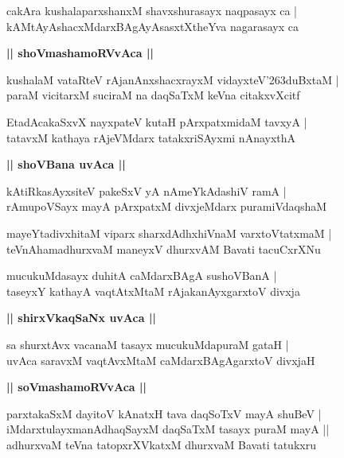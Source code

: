 \documentclass[twoside,12pt,openright]{book}
\def\S{\char'263}
\newcounter{shloka}[chapter]
\def\uvaca#1{\centerline{{\large\textbf{#1}}}}
\begin{document}
\begin{shloka}%
cakAra kushalaparxshanxM shavxshurasayx naqpasayx ca |\\
kAMtAyAshacxMdarxBAgAyAsasxtXtheYva nagarasayx ca 
\end{shloka}

\uvaca{|| shoVmashamoRVvAca ||}

\begin{shloka}%
kushalaM vataRteV rAjanAnxshacxrayxM vidayxteV\S duBxtaM |\\
paraM vicitarxM suciraM na daqSaTxM keVna citakxvXcitf 
\end{shloka}

\begin{shloka}%
EtadAcakaSxvX nayxpateV kutaH pArxpatxmidaM tavxyA |\\
tatavxM kathaya rAjeVMdarx tatakxriSAyxmi nAnayxthA 
\end{shloka}

\uvaca{|| shoVBana uvAca ||}

\begin{shloka}%
kAtiRkasAyxsiteV  pakeSxV yA nAmeYkAdashiV ramA |\\
rAmupoVSayx mayA pArxpatxM divxjeMdarx puramiVdaqshaM 
\end{shloka}

\begin{shloka}%
mayeYtadivxhitaM viparx sharxdAdhxhiVnaM varxtoVtatxmaM |\\
teVnAhamadhurxvaM maneyxV dhurxvAM Bavati tacuCxrXNu
\end{shloka}

\begin{shloka}%
mucukuMdasayx duhitA caMdarxBAgA sushoVBanA |\\
taseyxY kathayA vaqtAtxMtaM rAjakanAyxgarxtoV divxja
\end{shloka}

\uvaca{|| shirxVkaqSaNx uvAca ||}

\begin{shloka}%
sa shurxtAvx vacanaM tasayx mucukuMdapuraM gataH |\\
uvAca saravxM vaqtAvxMtaM caMdarxBAgAgarxtoV divxjaH
\end{shloka}

\uvaca{|| soVmashamoRVvAca ||}

\begin{shloka}%
parxtakaSxM dayitoV kAnatxH tava daqSoTxV mayA shuBeV |\\
iMdarxtulayxmanAdhaqSayxM daqSaTxM tasayx puraM mayA ||\\
adhurxvaM teVna tatopxrXVkatxM dhurxvaM Bavati tatukxru
\end{shloka}
\end{document}
